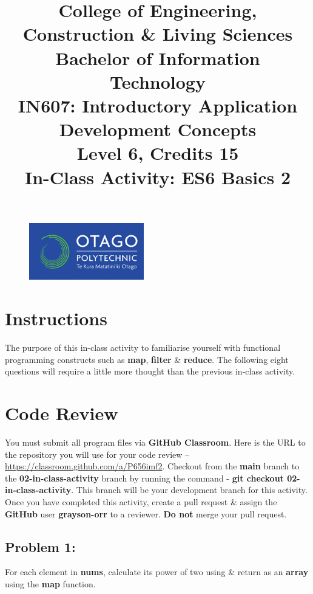 \documentclass{article}
\author{}
\begin{document}
\begin{figure}
    \centering
    \includegraphics[width=50mm]{../img/logo.png}
\end{figure}

\title{College of Engineering, Construction \& Living Sciences\\Bachelor of Information Technology\\IN607: Introductory Application Development Concepts\\Level 6, Credits 15\\\textbf{In-Class Activity: ES6 Basics 2}}
\date{}
\maketitle
 
\section*{Instructions}
The purpose of this in-class activity to familiarise yourself with functional programming constructs such as \textbf{map}, \textbf{filter} \& \textbf{reduce}. The following eight questions will require a little more thought than the previous in-class activity.

\section*{Code Review}
You must submit all program files via \textbf{GitHub Classroom}. Here is the URL to the repository you will use for your code review – \href{https://classroom.github.com/a/P656imf2}{https://classroom.github.com/a/P656imf2}. Checkout from the \textbf{main} branch to the \textbf{02-in-class-activity} branch by running the command - \textbf{git checkout 02-in-class-activity}. This branch will be your development branch for this activity. Once you have completed this activity, create a pull request \& assign the \textbf{GitHub} user \textbf{grayson-orr} to a reviewer. \textbf{Do not} merge your pull request.

\subsection*{Problem 1:} 
For each element in \textbf{nums}, calculate its power of two using \& return as an \textbf{array} using the \textbf{map} function. 
\end{document}
